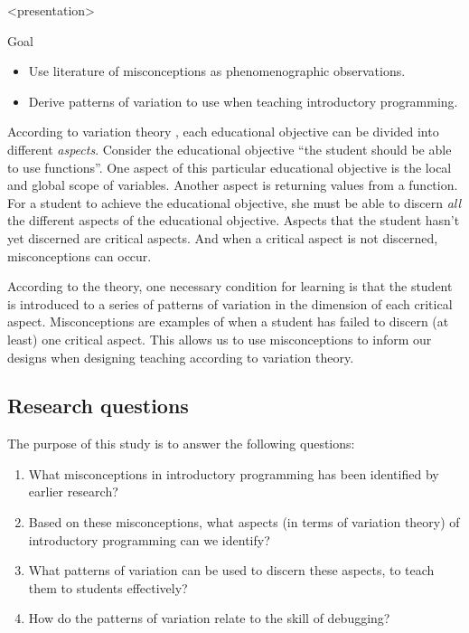 \begin{frame}<presentation>
  \begin{block}{Goal}
    \begin{itemize}
      \item Use literature of misconceptions as phenomenographic 
        observations.
      \item Derive patterns of variation to use when teaching introductory 
        programming.
    \end{itemize}
  \end{block}
\end{frame}

According to variation theory \autocite[Ch.~2]{NCOL}, each educational 
objective can be divided into different \emph{aspects}.
Consider the educational objective \enquote{the student should be able to use 
functions}.
One aspect of this particular educational objective is the local and global 
scope of variables.
Another aspect is returning values from a function.
For a student to achieve the educational objective, she must be able to discern 
\emph{all} the different aspects of the educational objective.
Aspects that the student hasn't yet discerned are critical aspects.
And when a critical aspect is not discerned, misconceptions can occur.

According to the theory, one necessary condition for learning is that the 
student is introduced to a series of patterns of variation in the dimension of 
each critical aspect.
Misconceptions are examples of when a student has failed to discern (at least) 
one critical aspect.
This allows us to use misconceptions to inform our designs when designing 
teaching according to variation theory.

\subsection{Research questions}

The purpose of this study is to answer the following questions:
\begin{frame}
\begin{enumerate}
  \item<1> What misconceptions in introductory programming has been identified 
    by earlier research?
  \item<2-3> Based on these misconceptions, what aspects (in terms of variation 
    theory) of introductory programming can we identify?
  \item<3> What patterns of variation can be used to discern these aspects, to 
    teach them to students effectively?
  \item<4> How do the patterns of variation relate to the skill of debugging?
\end{enumerate}
\end{frame}
